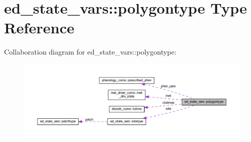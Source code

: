 \hypertarget{structed__state__vars_1_1polygontype}{}\section{ed\+\_\+state\+\_\+vars\+:\+:polygontype Type Reference}
\label{structed__state__vars_1_1polygontype}


Collaboration diagram for ed\+\_\+state\+\_\+vars\+:\+:polygontype\+:\nopagebreak
\begin{figure}[H]
\begin{center}
\leavevmode
\includegraphics[width=350pt]{structed__state__vars_1_1polygontype__coll__graph}
\end{center}
\end{figure}
